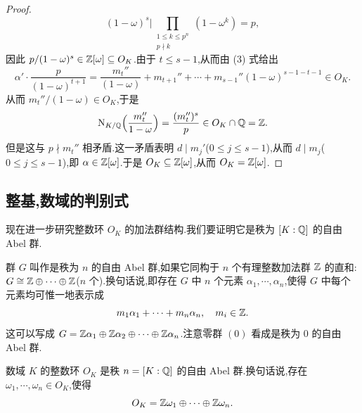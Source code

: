 \begin{proof}
\[
  (1-\omega)^s\Big|\prod_{\substack{1\leqslant k\leqslant p^n\\ p\nmid k}}(1-\omega^k)=p,
\]
因此 $p/(1-\omega)^s\in\mathbb{Z}[\omega]\subseteq O_K$.由于 $t\leqslant s-1$,从而由 (3) 式给出
\[
  \alpha'\cdot\frac{p}{(1-\omega)^{t+1}}
  =\frac{m_t''}{(1-\omega)}+m_{t+1}''+\cdots+m_{s-1}''(1-\omega)^{s-1-t-1}\in O_K.
\]
从而 $m_t''/(1-\omega)\in O_K$,于是
\[
  \mathrm{N}_{K/\mathbb{Q}}\Big(\frac{m_t''}{1-\omega}\Big)=\frac{(m_t'')^s}{p}\in O_K\cap\mathbb{Q}=\mathbb{Z}.
\]
但是这与 $p\nmid m_t''$ 相矛盾.这一矛盾表明 $d\mid m_j'$($0\leqslant j\leqslant s-1$),从而 $d\mid m_j$($0\leqslant j\leqslant s-1$),即 $\alpha\in\mathbb{Z}[\omega]$.于是 $O_K\subseteq\mathbb{Z}[\omega]$,从而 $O_K=\mathbb{Z}[\omega]$.
\end{proof}

\subsection{整基,数域的判别式}\label{sec:ch1-s2-3}

现在进一步研究整数环 $O_K$ 的加法群结构.我们要证明它是秩为 $[K:\mathbb{Q}]$ 的自由 Abel 群.

\begin{definition}\label{def:ch1-2}
群 $G$ 叫作是秩为 $n$ 的自由 Abel 群,如果它同构于 $n$ 个有理整数加法群 $\mathbb{Z}$ 的直和:$G\cong\mathbb{Z}\oplus\cdots\oplus\mathbb{Z}$($n$ 个).换句话说,即存在 $G$ 中 $n$ 个元素 $\alpha_1,\cdots,\alpha_n$,使得 $G$ 中每个元素均可惟一地表示成
\[
  m_1\alpha_1+\cdots+m_n\alpha_n,\quad m_i\in\mathbb{Z}.
\]
这可以写成 $G=\mathbb{Z}\alpha_1\oplus\mathbb{Z}\alpha_2\oplus\cdots\oplus\mathbb{Z}\alpha_n$.注意零群 $(0)$ 看成是秩为 $0$ 的自由 Abel 群.
\end{definition}

\begin{theorem}\label{thm:1.11}
数域 $K$ 的整数环 $O_K$ 是秩 $n=[K:\mathbb{Q}]$ 的自由 Abel 群.换句话说,存在 $\omega_1,\cdots,\omega_n\in O_K$,使得
\[
  O_K=\mathbb{Z}\omega_1\oplus\cdots\oplus\mathbb{Z}\omega_n.
\]
\end{theorem}

